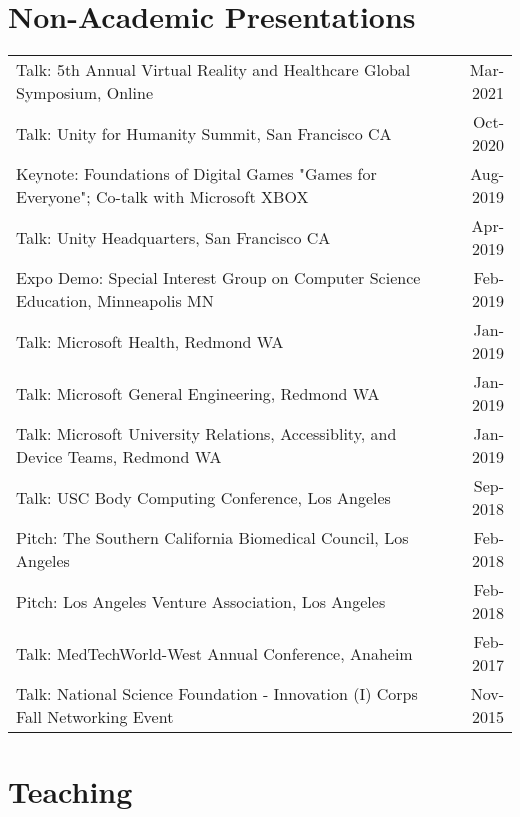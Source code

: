 \documentclass[10pt,a4paper]{article}
\begin{document}
  \vspace*{2mm}\section*{Non-Academic Presentations}

  \vspace*{1mm}\noindent\begin{tabularx}{17cm}{X r}
    Talk: 5th Annual Virtual Reality and Healthcare Global Symposium, Online & Mar-2021\\
    Talk: Unity for Humanity Summit, San Francisco CA & Oct-2020\\ 
    Keynote: Foundations of Digital Games "Games for Everyone"; Co-talk with Microsoft XBOX & Aug-2019 \\
    Talk: Unity Headquarters, San Francisco CA & Apr-2019\\
    Expo Demo: Special Interest Group on Computer Science Education, Minneapolis MN & Feb-2019\\ %
    Talk: Microsoft Health, Redmond WA & Jan-2019\\
    Talk: Microsoft General Engineering, Redmond WA & Jan-2019\\
    Talk: Microsoft University Relations, Accessiblity, and Device Teams, Redmond WA & Jan-2019\\
    Talk: USC Body Computing Conference, Los Angeles & Sep-2018\\ %
    Pitch: The Southern California Biomedical Council, Los Angeles & Feb-2018 \\ %
    Pitch: Los Angeles Venture Association, Los Angeles & Feb-2018 \\%
    Talk: MedTechWorld-West Annual Conference, Anaheim & Feb-2017\\ %
    Talk: National Science Foundation - Innovation (I) Corps Fall Networking Event & Nov-2015\\
  \end{tabularx}

\vspace*{2mm}\section*{Teaching}
\end{document}
